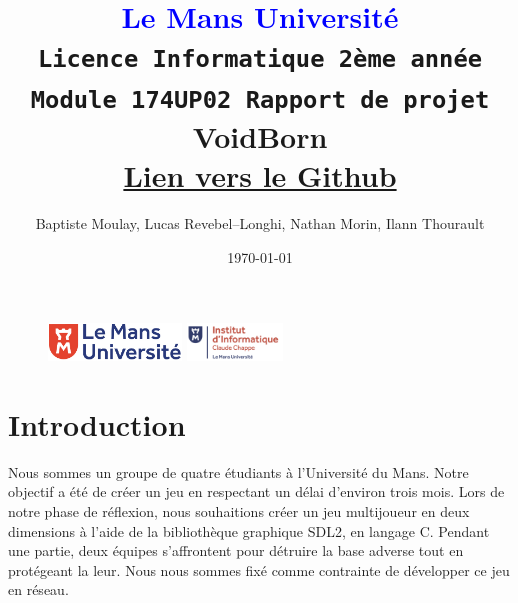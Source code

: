 \documentclass[11pt]{article}
\begin{document}
\begin{figure}
    \includegraphics[height=1cm]{logolemansU.png}
    \hfill
    \includegraphics[height=1cm]{logo_IC2.png}
\end{figure}
    \title { 
        \textcolor{blue}{Le Mans Université} \\
        \texttt{Licence Informatique 2ème année} \\
        \texttt{Module 174UP02 Rapport de projet}\\
        \textbf{VoidBorn}\\
        \href{https://github.com/Herebios/projet}{Lien vers le Github}
    }
    
    \author{Baptiste Moulay, Lucas Revebel--Longhi, Nathan Morin, Ilann Thourault} 
    \date{\today} 
    \maketitle

    \newpage
    \tableofcontents
    \newpage
    
    \section{Introduction}
    Nous sommes un groupe de quatre étudiants à l’Université du Mans. Notre objectif a été de créer un jeu en respectant un délai d’environ trois mois.
    Lors de notre phase de réflexion, nous souhaitions créer un jeu multijoueur en deux dimensions à l’aide de la bibliothèque graphique SDL2, en langage C.
    Pendant une partie, deux équipes s’affrontent pour détruire la base adverse tout en protégeant la leur.
    Nous nous sommes fixé comme contrainte de développer ce jeu en réseau.
\end{document}

